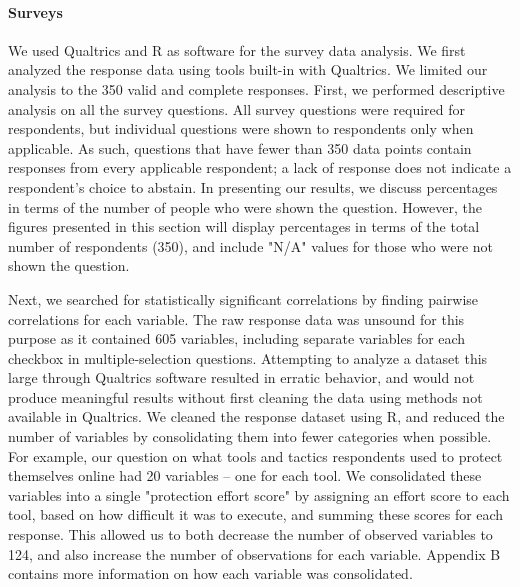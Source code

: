 \paragraph{Surveys} We used Qualtrics and R as software for the survey data analysis. We first analyzed the
response data using tools built-in with Qualtrics. We limited our analysis to
the 350 valid and complete responses. First, we performed descriptive analysis on all the survey questions. All survey questions were required for respondents, but individual questions
were shown to respondents only when applicable. As such, questions that have
fewer than 350 data points contain responses from every applicable respondent;
a lack of response does not indicate a respondent's choice to abstain. In
presenting our results, we discuss percentages in terms of the number of
people who were shown the question. However, the figures presented in this
section will display percentages in terms of the total number of respondents
(350), and include "N/A" values for those who were not shown the question.

Next, we searched for statistically
significant correlations by finding pairwise correlations for each variable.
The raw response data was unsound for this purpose as it contained 605
variables, including separate variables for each checkbox in
multiple-selection questions. Attempting to analyze a dataset this large
through Qualtrics software resulted in erratic behavior, and would not produce
meaningful results without first cleaning the data using methods not available
in Qualtrics. We cleaned the response dataset using R, and reduced the number
of variables by consolidating them into fewer categories when possible. For
example, our question on what tools and tactics respondents used to protect
themselves online had 20 variables -- one for each tool. We consolidated these
variables into a single "protection effort score" by assigning an effort score
to each tool, based on how difficult it was to execute, and summing these
scores for each response. This allowed us to both decrease the number of
observed variables to 124, and also increase the number of observations for
each variable. Appendix B contains more information on how each variable was
consolidated. 

